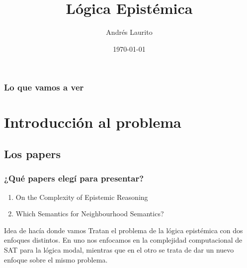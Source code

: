\documentclass{beamer}
\title[L\'ogica Epist\'emica]{L\'ogica Epist\'emica} %
\author{Andr\'es Laurito} %
\institute[L\'ogicas Modales] %
{
Primer cuatrimestre 2016 \\ %
\medskip
\textit{andy.laurito@hotmail.com} %
}
\date{\today} %
\begin{document}
\begin{frame}
\titlepage %
\end{frame}

\begin{frame}
\frametitle{Lo que vamos a ver} %
\tableofcontents %
\end{frame}


\section{Introducci\'on al problema} 

\subsection{Los papers}

\begin{frame}
\frametitle{¿Qu\'e papers eleg\'i para presentar?}
\begin{enumerate}
\item On the Complexity of Epistemic Reasoning
\item Which Semantics for Neighbourhood Semantics?
\end{enumerate}

\begin{block}{Idea de hac\'ia donde vamos}
Tratan el problema de la l\'ogica epist\'emica con dos enfoques distintos. En uno nos enfocamos en la complejidad computacional de SAT para la l\'ogica modal, mientras que en el otro se trata de dar un nuevo enfoque sobre el mismo problema.
\end{block}


\end{frame}
\end{document}
